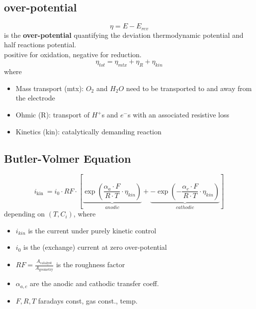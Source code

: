 \documentclass[a4paper,10pt,landscape]{scrartcl}
\begin{document}
\begin{multicols*}{3}
\subsection{over-potential}
$$\eta =E-E_{rev}$$
is the \textbf{over-potential} quantifying the deviation thermodynamic potential and half reactions potential.\\
positive for oxidation, negative for reduction. \\
$$\eta_{tot}=\eta_{mtx}+\eta_R+\eta_{kin}$$
where 
\begin{itemize}
    \item Mass transport (mtx): $O_2$ and $H_2O$ need to be transported to and away from the electrode
    \item  Ohmic (R): transport of $H^+$s and $e^-$s with an associated resistive loss
    \item Kinetics (kin): catalytically demanding reaction
\end{itemize}

\subsection{Butler-Volmer Equation}
$$
i_{\text {kin }}=i_0 \cdot R F \cdot\left[\underbrace{\exp \left(\frac{\alpha_a \cdot F}{R \cdot T} \cdot \eta_{k i n}\right)}_{anodic}+\underbrace{-\exp \left(-\frac{\alpha_c \cdot F}{R \cdot T} \cdot \eta_{k i n}\right)}_{cathodic}\right]
$$
depending on $\left(T, C_i\right)$, where
\begin{itemize}
    \item $i_{kin}$ is the current under purely kinetic control
    \item $i_0$ is the (exchange) current at zero over-potential
    \item $RF=\frac{A_{\text{catalyst}}}{A_{\text{geometry}
    }}$ is the roughness factor
    \item $\alpha_{a,c}$ are the anodic and cathodic transfer coeff.
    \item $F,R,T$ faradays const, gas const., temp.
\end{itemize}


\end{multicols*}
\end{document}
